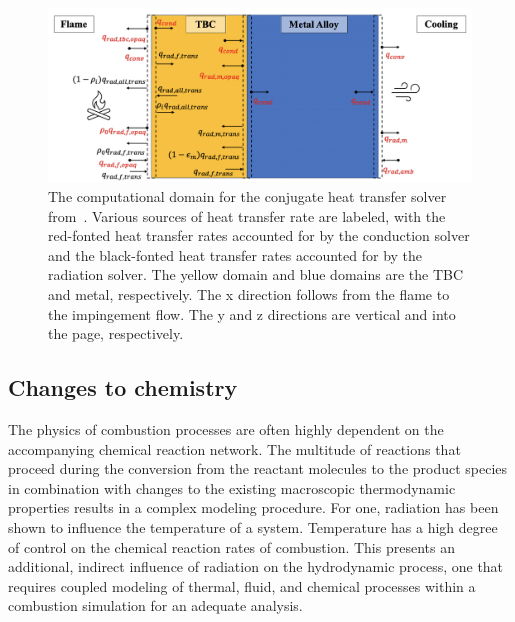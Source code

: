 \begin{figure}
\centering
\includegraphics[width=1\linewidth]{figures/ch2/TBC.png}
\caption{The computational domain for the conjugate heat transfer solver from~\cite{Tricard2021ModelingEnvironments.}. Various sources of heat transfer rate are labeled, with the red-fonted heat transfer rates accounted for by the conduction solver and the black-fonted heat transfer rates accounted for by the radiation solver. The yellow domain and blue domains are the TBC and metal, respectively. The x direction follows from the flame to the impingement flow. The y and z directions are vertical and into the page, respectively. }
\label{fig:TBC}
\end{figure}

\subsection{Changes to chemistry}
The physics of combustion processes are often highly dependent on the accompanying chemical reaction network.
The multitude of reactions that proceed during the conversion from the reactant molecules to the product species in combination with changes to the existing macroscopic thermodynamic properties results in a complex modeling procedure.
For one, radiation has been shown to influence the temperature of a system. Temperature has a high degree of control on the chemical reaction rates of combustion.
This presents an additional, indirect influence of radiation on the hydrodynamic process, one that requires coupled modeling of thermal, fluid, and chemical processes within a combustion simulation for an adequate analysis.

